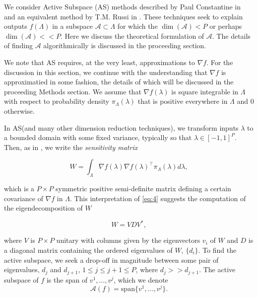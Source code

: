 \documentclass{amsart}
\newcommand{\A}{\mathcal{A}}
\begin{document}
We consider Active Subspace (AS) methods described by Paul Constantine in \cite{Constantine2015} and an equivalent method by T.M. Russi in \cite{Russi}. These techniques seek to explain outputs $f(\Lambda)$ in a subspace $\A \subset \Lambda$ for which the $\dim (\A) <P$ or perhaps $\dim(\A)<<P$. Here we discuss the theoretical formulation of $\A$. The details of finding $\A$ algorithmically is discussed in the proceeding section.

We note that AS requires, at the very least, approximations to $\nabla f$. For the discussion in this section, we continue with the understanding that $\nabla f$ is approximatied in some fashion, the details of which will be discussed in the proceeding Methods section. We assume that $\nabla f(\lambda)$ %
 is square integrable in $\Lambda$ with respect to %
 probability density $\pi_\Lambda(\lambda)$ that is positive everywhere in $\Lambda$ and 0 otherwise.
 
In AS(and many other dimension reduction techniques\cite{Russi}), we transform inputs $\lambda$ to a bounded domain %
with some fixed variance, typically so that $\lambda\in [-1,1]^P$. Then, as in \cite{ConstantineMC}, we write the \textit{sensitivity matrix}

\begin{equation} \label{eq:4}
W=\int_\Lambda \nabla f(\lambda) \nabla f(\lambda)^\top  \pi_\Lambda(\lambda) d\lambda,
\end{equation} 

\noindent which is a $P\times P$ symmetric positive semi-definite matrix defining a certain covariance of $\nabla f$ in $\Lambda$. This interpretation of \eqref{eq:4} suggests the computation of the eigendecomposition of $W$ %

\begin{equation} \label{eq:5}
W=VDV^*,
\end{equation} 

\noindent where $V$ is $P \times P$ unitary with columns given by the eigenvectors $v_i$ of $W$ and $D$ is a diagonal matrix containing the ordered eigenvalues of $W$, $\{d_i\}$. %
To find the active subspace, %
we seek %
a drop-off in magnitude between some pair of eigenvalues, $d_{j}$ and $d_{j+1}$, $1\leq j \leq j+1 \leq P$, where $d_{j}>>d_{j+1}$. The active subspace of $f$ is the span of $v^1,\ldots,v^{j}$, which we denote %
\begin{equation} \label{eq:6}
\A(f)=\text{span}\{v^1,\ldots,v^j\}.
\end{equation}
\end{document}
